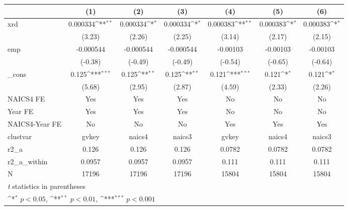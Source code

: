 {
\def\sym#1{\ifmmode^{#1}\else\(^{#1}\)\fi}
\begin{tabular}{l*{6}{c}}
\hline\hline
            &\multicolumn{1}{c}{(1)}         &\multicolumn{1}{c}{(2)}         &\multicolumn{1}{c}{(3)}         &\multicolumn{1}{c}{(4)}         &\multicolumn{1}{c}{(5)}         &\multicolumn{1}{c}{(6)}         \\
\hline
xrd         &    0.000334\sym{**} &    0.000334\sym{*}  &    0.000334\sym{*}  &    0.000383\sym{**} &    0.000383\sym{*}  &    0.000383\sym{*}  \\
            &      (3.23)         &      (2.26)         &      (2.25)         &      (3.14)         &      (2.17)         &      (2.15)         \\
[1em]
emp         &   -0.000544         &   -0.000544         &   -0.000544         &    -0.00103         &    -0.00103         &    -0.00103         \\
            &     (-0.38)         &     (-0.49)         &     (-0.49)         &     (-0.54)         &     (-0.65)         &     (-0.64)         \\
[1em]
\_cons      &       0.125\sym{***}&       0.125\sym{**} &       0.125\sym{**} &       0.121\sym{***}&       0.121\sym{*}  &       0.121\sym{*}  \\
            &      (5.68)         &      (2.95)         &      (2.87)         &      (4.59)         &      (2.33)         &      (2.26)         \\
[1em]
NAICS4 FE   &         Yes         &         Yes         &         Yes         &          No         &          No         &          No         \\
[1em]
Year FE     &         Yes         &         Yes         &         Yes         &          No         &          No         &          No         \\
[1em]
NAICS4-Year FE&          No         &          No         &          No         &         Yes         &         Yes         &         Yes         \\
\hline
clustvar    &       gvkey         &      naics4         &      naics3         &       gvkey         &      naics4         &      naics3         \\
r2\_a        &       0.126         &       0.126         &       0.126         &      0.0782         &      0.0782         &      0.0782         \\
r2\_a\_within &      0.0957         &      0.0957         &      0.0957         &       0.111         &       0.111         &       0.111         \\
N           &       17196         &       17196         &       17196         &       15804         &       15804         &       15804         \\
\hline\hline
\multicolumn{7}{l}{\footnotesize \textit{t} statistics in parentheses}\\
\multicolumn{7}{l}{\footnotesize \sym{*} \(p<0.05\), \sym{**} \(p<0.01\), \sym{***} \(p<0.001\)}\\
\end{tabular}
}
